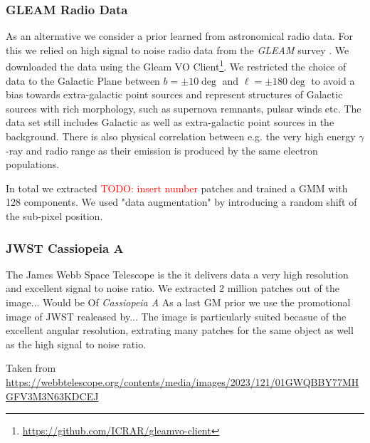 \documentclass[twocolumn]{aastex631}
\newcommand{\gammaray}{$\gamma$-ray\xspace}
\newcommand{\todo}[1]{\textcolor{red}{TODO: #1}\PackageWarning{TODO:}{#1!}}
\begin{document}
    \subsubsection{GLEAM Radio Data}
    \label{sssec:gleam-radio-data}
    As an alternative we consider a prior learned from astronomical radio data. For this we relied on high signal to noise radio data from the \textit{GLEAM} survey \cite{HurleyWalker2022}. We downloaded the data using the Gleam VO Client\footnote{\url{https://github.com/ICRAR/gleamvo-client}}. We restricted the choice of data to the Galactic Plane between $b=\pm10\deg$ and $\ell = \pm180\deg$ to avoid a bias towards extra-galactic point sources and represent structures of Galactic sources with rich morphology, such as supernova remnants, pulsar winds etc. The data set still includes Galactic as well as extra-galactic point sources in the background. There is also physical correlation between e.g. the very high energy \gammaray and radio range as their emission is produced by the same electron populations.

    
    In total we extracted \todo{insert number} patches and trained a GMM with 128 components. We used "data augmentation" by introducing a random shift of the sub-pixel position.

    \subsubsection{JWST Cassiopeia A}
    The James Webb Space Telescope is the it delivers data a very high resolution and excellent signal to noise ratio. We extracted 2 million patches out of the image...
    Would be 
    Of \textit{Cassiopeia A}
    As a last GM prior we use the promotional image of JWST realeased by...
    The image is particularly suited becasue of the excellent angular resolution, extrating many patches for the same object
    as well as the high signal to noise ratio. 

    Taken from \url{https://webbtelescope.org/contents/media/images/2023/121/01GWQBBY77MHGFV3M3N63KDCEJ}
    
\end{document}
